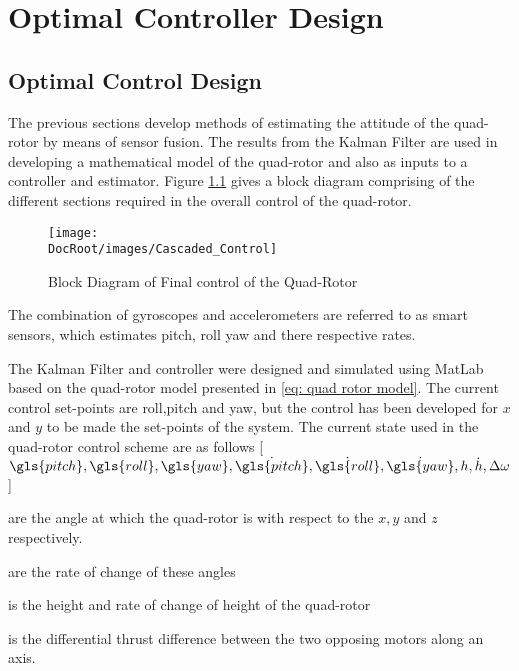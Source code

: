 \chapter{Optimal Controller Design}

\section{Optimal Control Design}
The previous sections develop methods of estimating the attitude of the quad-rotor by means of sensor fusion. The results from the Kalman Filter are used in developing a mathematical model of the quad-rotor and also as inputs to a controller and estimator. Figure \ref{Fig: Block Diagram of Final control of the Quad-Rotor} gives a block diagram comprising of the different sections required in the overall control of the quad-rotor.



\begin{figure}[h]
	\centering
	\texttt{[image: \\DocRoot/images/Cascaded\_Control]}
	\caption{Block Diagram of Final control of the Quad-Rotor}
	\label{Fig: Block Diagram of Final control of the Quad-Rotor}
\end{figure}
The combination of gyroscopes and accelerometers are referred to as smart sensors, which estimates pitch, roll yaw and there respective rates.

The Kalman Filter and controller were designed and simulated using MatLab based on the quad-rotor model presented in \ref{eq: quad rotor model}. The current control set-points are roll,pitch and yaw, but the control has been developed for $x$ and $y$ to be made the set-points of the system. The current state used in the quad-rotor control scheme are as follows [$\gls{pitch},\gls{roll},\gls{yaw},\dot{\gls{pitch}},\dot{\gls{roll}},\dot{\gls{yaw}},h,\dot{h},\Delta\omega$]

\newpage
{
	\begin{description}[itemsep=1mm]
		\item[{\bf Where:-}]
		\item[\gls{pitch},\gls{roll},\gls{yaw}:] are the angle at which the quad-rotor is with respect to the $x,y$ and $z$ respectively.
		\item[$\dot{\gls{pitch}},\dot{\gls{roll}},\dot{\gls{yaw}}$:] are the rate of change of these angles
		\item[$h,\dot{h}$:] is the height and rate of change of height of the quad-rotor 
		\item[$\Delta\omega$:] is the differential thrust difference between the two opposing motors
		along an axis. 
	\end{description}
}

